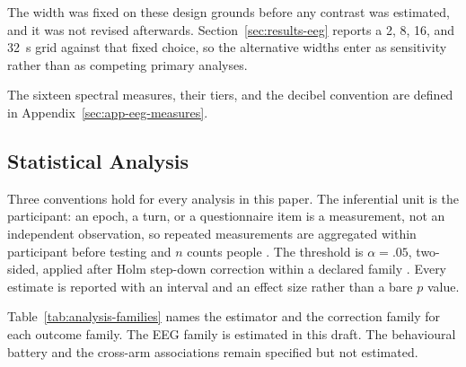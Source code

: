 \documentclass[english]{article}
\begin{document}
The width was fixed on these design grounds before any contrast was estimated, and it was not revised afterwards. Section~\ref{sec:results-eeg} reports a 2, 8, 16, and 32~s grid against that fixed choice, so the alternative widths enter as sensitivity rather than as competing primary analyses.

The sixteen spectral measures, their tiers, and the decibel convention are defined in Appendix~\ref{sec:app-eeg-measures}.

\subsection{Statistical Analysis}
\label{sec:stats}


Three conventions hold for every analysis in this paper. The inferential unit is the participant: an epoch, a turn, or a questionnaire item is a measurement, not an independent observation, so repeated measurements are aggregated within participant before testing and \(n\) counts people \cite{pernet2020cobidas}. The threshold is \(\alpha=.05\), two-sided, applied after Holm step-down correction within a declared family \cite{holm1979simple}. Every estimate is reported with an interval and an effect size rather than a bare \(p\) value.

Table~\ref{tab:analysis-families} names the estimator and the correction family for each outcome family. The EEG family is estimated in this draft. The behavioural battery and the cross-arm associations remain specified but not estimated.
\end{document}
